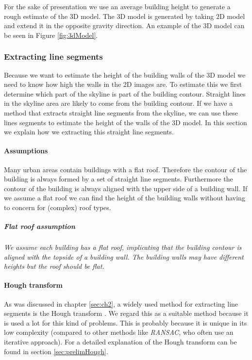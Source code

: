 For the sake of presentation we use an average building height to generate a
rough estimate of the 3D model.  The 3D model is generated by taking 2D model
and extend it in the opposite gravity direction.  An example of the 3D model can
be seen in Figure \ref{fig:3dModel}.





\subsubsection{Extracting line segments}
\label{extractinglinesegments}
	Because we want to estimate the height of the building walls of the 3D model we
	need to know how high the walls in the 2D images are.  To estimate this we
	first determine which part of the skyline is part of the building contour.
	Straight lines in the skyline area are likely to come from the building
	contour.  If we have a method that extracts straight line segments from the
	skyline, we can use these lines segments to estimate the height of the walls
	of the 3D model.  In this section we explain how we extracting this straight
	line segments.  \\

\paragraph{Assumptions}
	Many urban areas contain buildings with a flat roof. Therefore the contour
	of the building is always formed by a set of straight line segments.
	Furthermore the contour of the building is always aligned with the upper
	side of a building wall.  If we assume a flat roof we can find the height of
	the building walls without having to concern for (complex) roof types.

	\subparagraph{Flat roof assumption}
	\emph{We assume each building has a flat roof, implicating that the building
	contour is aligned with the topside of a building wall.  The building walls
	may have different heights but the roof should be flat.}\\


\paragraph{Hough transform}
	As was discussed in chapter \ref{sec:ch2}, a widely used method for extracting line segments is the Hough transform \cite{Hough}.
	We regard this as a suitable method because it is
	used a lot for this kind of problems. This is probably because it is unique
	in its low complexity (compared to other methods like
	\emph{RANSAC}, who often use an iterative approach).
	For a detailed explanation of the Hough transform can be found in section
	\ref{sec:prelimHough}.\\

